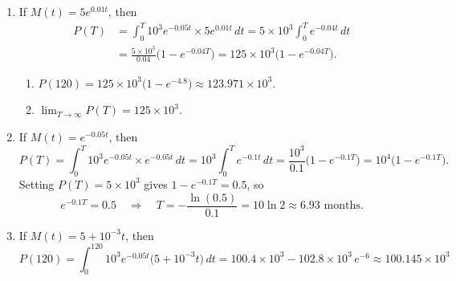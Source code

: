 \documentclass[11pt]{exam}
\begin{document}
\begin{questions}
\begin{solution}
\begin{enumerate}[label=(\alph*)]
  \item If \(M(t)=5e^{0.01t}\), then
  \begin{align*}
      P(T) &= \int_{0}^{T}10^3e^{-0.05t}\times 5e^{0.01t}\,dt
           = 5\times10^3\int_{0}^{T}e^{-0.04t}\,dt \\
           &= \frac{5\times10^3}{0.04}\bigl(1-e^{-0.04T}\bigr)
           = 125\times10^3\bigl(1-e^{-0.04T}\bigr).
  \end{align*}
  \begin{enumerate}[label=(\roman*)]
    \item \(P(120)=125\times10^3\bigl(1-e^{-4.8}\bigr)\approx123.971\times10^3.\)
    \item \(\lim_{T\to\infty}P(T)=125\times10^3.\)
  \end{enumerate}

  \item If \(M(t)=e^{-0.05t}\), then
  \[
    P(T)=\int_{0}^{T}10^3e^{-0.05t}\times e^{-0.05t}\,dt
         =10^3\int_{0}^{T}e^{-0.1t}\,dt
         =\frac{10^3}{0.1}\bigl(1-e^{-0.1T}\bigr)
         =10^4\bigl(1-e^{-0.1T}\bigr).
  \]
  Setting \(P(T)=5\times10^3\) gives \(1-e^{-0.1T}=0.5\), so 
  \[
    e^{-0.1T}=0.5
    \quad\Longrightarrow\quad
    T=-\frac{\ln(0.5)}{0.1}=10\ln2\approx6.93\text{ months}.
  \]

  \item If \(M(t)=5+10^{-3}t\), then
  \[
    P(120)=\int_{0}^{120}10^3e^{-0.05t}\bigl(5+10^{-3}t\bigr)\,dt
           =100.4\times10^3 - 102.8\times10^3\,e^{-6}
           \approx100.145\times10^3
  \]
\end{enumerate}
\end{solution}

\end{questions}	
\end{document}
